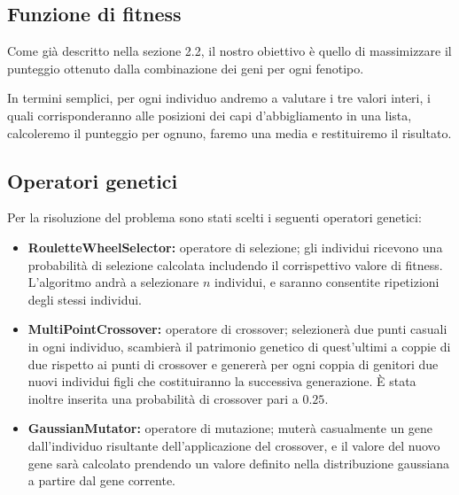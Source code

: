 \documentclass[a4paper, 11pt, oneside]{report}
\begin{document}
                \subsection{Funzione di fitness}
                \par \noindent Come già descritto nella sezione 2.2, il
                nostro obiettivo è quello di massimizzare il punteggio ottenuto dalla combinazione dei geni per ogni
                fenotipo.
                \par \noindent In termini semplici, per ogni individuo andremo a valutare i tre valori interi, i quali
                corrisponderanno alle posizioni dei capi d'abbigliamento in una lista, calcoleremo il punteggio per ognuno,
                faremo una media e restituiremo il risultato.

                \subsection{Operatori genetici}\label{subsec:op_gen}
                Per la risoluzione del problema sono stati scelti i seguenti operatori genetici:
                \begin{itemize}
                    \item \textbf{RouletteWheelSelector:} operatore di selezione; gli individui ricevono una probabilità
                    di selezione calcolata includendo il corrispettivo valore di fitness. L'algoritmo andrà a selezionare
                    $n$ individui, e saranno consentite ripetizioni degli stessi individui.
                    \item \textbf{MultiPointCrossover:} operatore di crossover; selezionerà due punti casuali in ogni
                    individuo, scambierà il patrimonio genetico di quest'ultimi a coppie di due rispetto ai punti di
                    crossover e genererà per ogni coppia di genitori due nuovi individui figli che costituiranno la
                    successiva generazione. È stata inoltre inserita una probabilità di crossover pari a $0.25$.
                    \item \textbf{GaussianMutator:} operatore di mutazione; muterà casualmente un gene dall'individuo
                    risultante dell'applicazione del crossover, e il valore del nuovo gene sarà calcolato prendendo un
                    valore definito nella distribuzione gaussiana a partire dal gene corrente.
                \end{itemize}
\end{document}

